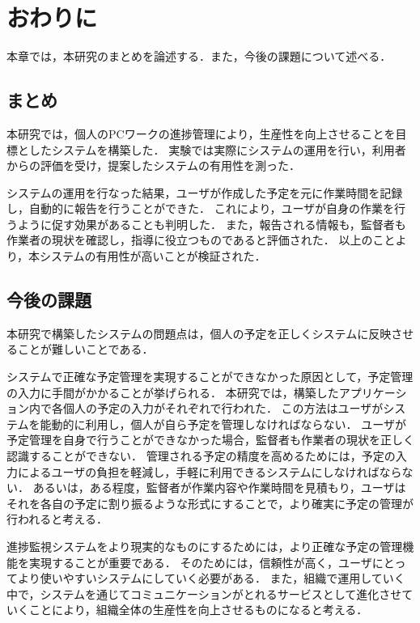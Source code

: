 \chapter{おわりに}
本章では，本研究のまとめを論述する．また，今後の課題について述べる．

\section{まとめ}
本研究では，個人のPCワークの進捗管理により，生産性を向上させることを目標としたシステムを構築した．
実験では実際にシステムの運用を行い，利用者からの評価を受け，提案したシステムの有用性を測った．

システムの運用を行なった結果，ユーザが作成した予定を元に作業時間を記録し，自動的に報告を行うことができた．
これにより，ユーザが自身の作業を行うように促す効果があることも判明した．
また，報告される情報も，監督者も作業者の現状を確認し，指導に役立つものであると評価された．
以上のことより，本システムの有用性が高いことが検証された．

\section{今後の課題}
本研究で構築したシステムの問題点は，個人の予定を正しくシステムに反映させることが難しいことである．

システムで正確な予定管理を実現することができなかった原因として，予定管理の入力に手間がかかることが挙げられる．
本研究では，構築したアプリケーション内で各個人の予定の入力がそれぞれで行われた．
この方法はユーザがシステムを能動的に利用し，個人が自ら予定を管理しなければならない．
ユーザが予定管理を自身で行うことができなかった場合，監督者も作業者の現状を正しく認識することができない．
管理される予定の精度を高めるためには，予定の入力によるユーザの負担を軽減し，手軽に利用できるシステムにしなければならない．
あるいは，ある程度，監督者が作業内容や作業時間を見積もり，ユーザはそれを各自の予定に割り振るような形式にすることで，より確実に予定の管理が行われると考える．

進捗監視システムをより現実的なものにするためには，より正確な予定の管理機能を実現することが重要である．
そのためには，信頼性が高く，ユーザにとってより使いやすいシステムにしていく必要がある．
また，組織で運用していく中で，システムを通じてコミュニケーションがとれるサービスとして進化させていくことにより，組織全体の生産性を向上させるものになると考える．
